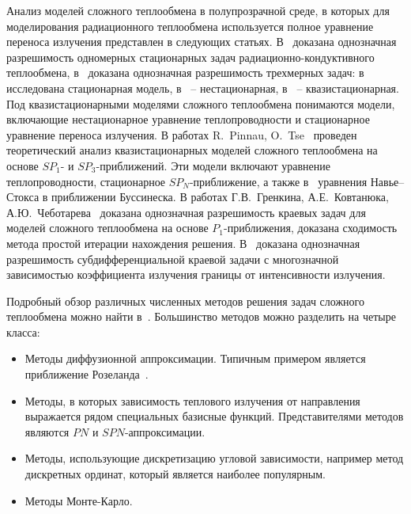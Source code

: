     Анализ моделей сложного теплообмена в полупрозрачной среде, в
    которых для моделирования радиационного теплообмена используется
    полное уравнение переноса излучения представлен в следующих статьях.
    В~\cite{asllanaj2003existence, kelley1996existence} доказана
    однозначная разрешимость одномерных стационарных
    задач радиационно-кондуктивного теплообмена,
    в~\cite{ghattassi2018existence, Porzio2004, Thompson2004} доказана
    однозначная разрешимость трехмерных задач: в~\cite{Thompson2004} исследована
    стационарная модель, в~\cite{Porzio2004} -- нестационарная,
    в~\cite{ghattassi2018existence} -- квазистационарная.
    Под квазистационарными моделями сложного теплообмена понимаются
    модели, включающие нестационарное уравнение теплопроводности и
    стационарное уравнение переноса излучения.
    В работах R.\ Pinnau, O.\ Tse~\cite{Pinnau2007, Pinnau2013}
    проведен теоретический анализ квазистационарных моделей сложного
    теплообмена на основе $SP_1$- и $SP_3$-приближений.
    Эти модели включают уравнение теплопроводности, стационарное $SP_N$-приближение, а также
    в~\cite{Pinnau2013} уравнения Навье–Стокса в приближении Буссинеска.
    В работах Г.В.\ Гренкина, А.Е.\ Ковтанюка,
    А.Ю.\ Чеботарева~\cite{Kovtanyuk2014, Kovtanyuk2016, Chebotarev22, Pak23}
    доказана однозначная разрешимость краевых задач для моделей
    сложного теплообмена на основе $P_1$-приближения, доказана сходимость
    метода простой итерации нахождения решения.
    В~\cite{Chebotarev2016Odnaznachnaya} доказана однозначная
    разрешимость субдифференциальной краевой задачи с многозначной
    зависимостью коэффициента излучения границы от интенсивности
    излучения.

    Подробный обзор различных численных методов решения задач сложного
    теплообмена можно найти в~\cite{modest2013radiative}.
    Большинство методов можно разделить на четыре класса:
    \begin{itemize}
        \item Методы диффузионной аппроксимации.
        Типичным примером является приближение Розеланда~\cite{farina2011mathematical, Siedow2011}.
        \item Методы, в которых зависимость теплового излучения от направления
        выражается рядом специальных базисные функций.
        Представителями методов являются $PN$ и $SPN$-аппроксимации.
        \item Методы, использующие дискретизацию угловой зависимости, например
        метод дискретных ординат, который является наиболее популярным.
        \item Методы Монте-Карло.
    \end{itemize}



